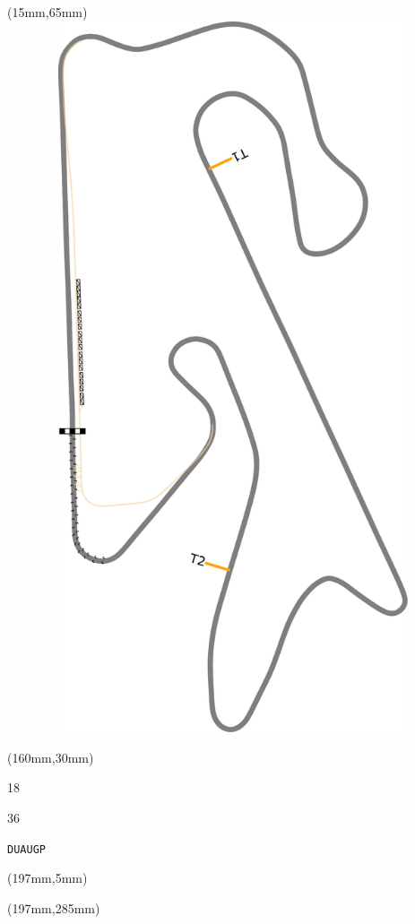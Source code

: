 \begin{textblock*}{185mm}(15mm,65mm)%
\centering
\mbox{\includegraphics[width=185mm,height=210mm,keepaspectratio]{PT/DUAUGP.pdf}}
\end{textblock*}
\begin{textblock*}{40mm}(160mm,30mm)%
\Large
\par{} 
\par18 
\par36 
\par\hfill\tiny\tt DUAUGP\\
\end{textblock*}
\begin{textblock*}{20mm}(197mm,5mm)%
\fbox{\thepage}
\label{DUAUGP}
\end{textblock*}
\begin{textblock*}{20mm}(197mm,285mm)%
\fbox{\thepage}
\end{textblock*}

